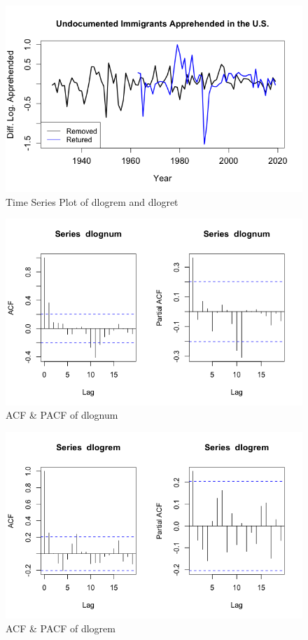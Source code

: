 \documentclass[a4paper]{article}
\begin{document}
\begin{figure}[h!]
\centering
\includegraphics[scale=0.4]{images/ts_dep_trans.png}
\caption{Time Series Plot of dlogrem and dlogret}
\label{fig:ts_dep_trans}
\end{figure}

\begin{figure}[h!]
\centering
\includegraphics[scale=0.4]{images/acf_pacf_dlognum.png}
\caption{ACF \& PACF of dlognum}
\label{fig:acf_pacf_dlognum}
\end{figure}

\begin{figure}[h!]
\centering
\includegraphics[scale=0.4]{images/acf_pacf_dlogrem.png}
\caption{ACF \& PACF of dlogrem}
\label{fig:acf_pacf_dlogrem}
\end{figure}
\end{document}
